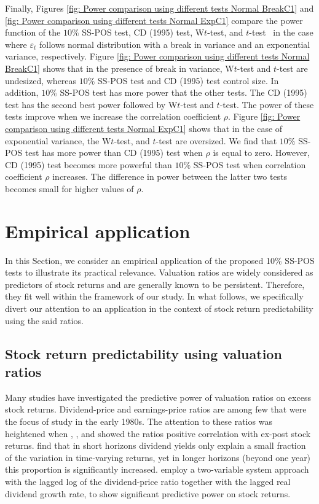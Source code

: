 \documentclass[harvard,11pt]{article}
\begin{document}
Finally, Figures \ref{fig: Power comparison using different tests Normal
BreakC1} and \ref{fig: Power comparison using different tests Normal ExpC1}
compare the power function of the $10\%$ SS-POS test, CD (1995) test, W$t$-test,
and $t$-test \ in the case where $\varepsilon _{t}$ follows normal
distribution with a break in variance and an exponential variance,
respectively. Figure \ref{fig: Power comparison using different tests
Normal BreakC1} shows that in the presence of break in variance, W$t$-test and
$t$-test are undesized, whereas $10\%$ SS-POS test and CD (1995) test control size.
In addition, $10\%$ SS-POS test has more power that the other tests. The
CD (1995) test has the second best power followed by W$t$-test and $t$-test. The
power of these tests improve when we increase the correlation coefficient $%
\rho .$ Figure \ref{fig: Power comparison using different tests Normal ExpC1}
shows that in the case of exponential variance, the W$t$-test, and $t$-test are
oversized. We find that $10\%$ SS-POS test has more power than CD (1995) test
when $\rho $ is equal to zero. However, CD (1995) test becomes more powerful than 
$10\%$ SS-POS test when correlation coefficient $\rho $ increases. The
difference in power between the latter two tests becomes small for higher
values of $\rho .$
\FloatBarrier
\section{Empirical application \label{Empirical
ApplicationC1}}
In this Section, we consider an empirical application of the proposed 10\% SS-POS tests to illustrate its practical relevance. Valuation ratios are widely considered as predictors of stock returns and are generally known to be persistent. Therefore, they fit well within the framework of our study. In what follows, we specifically divert our attention to an application in the context of stock return predictability using the said ratios.

\subsection{Stock return predictability using valuation ratios  \label{StockReturnPredictability}}

Many studies have investigated the predictive power of valuation ratios on excess stock returns. Dividend-price and earnings-price ratios
are among few that were the focus of study in the early 1980s. The attention to these ratios was heightened
 when \citet{rozeff1984dividend}, \citet{fama1988dividend}, and \citet{campbell1988dividend} showed the ratios positive correlation with ex-post stock returns. \citet{fama1988dividend} find that in short horizons dividend yields only explain a small fraction of the variation
 in time-varying returns, yet in longer horizons (beyond one year) 
this proportion is significantly increased. \citet{campbell1988dividend} employ a two-variable system approach with the lagged
log of the dividend-price ratio together with the lagged real dividend growth rate, to show significant predictive
power on stock returns. 
\end{document}
